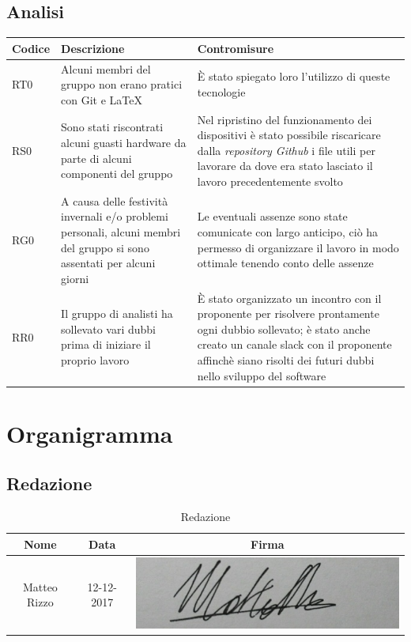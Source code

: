 \documentclass[./PianodiProgetto.tex]{subfiles}
\begin{document}
\section{Analisi}

\setlength\LTleft{-5.5mm}

\begin{longtable}{|p{15mm}|p{60mm}|p{60mm}|}
	\hline \textbf{Codice} & \textbf{Descrizione} & \textbf{Contromisure} \\
	\hline RT0 & Alcuni membri del gruppo non erano pratici con Git e \LaTeX &  È stato spiegato loro l'utilizzo di queste tecnologie \\
	\hline RS0 & Sono stati riscontrati alcuni guasti hardware da parte di alcuni componenti del gruppo & Nel ripristino del funzionamento dei dispositivi è stato possibile riscaricare dalla \textit{repository Github} i file utili per lavorare da dove era stato lasciato il lavoro precedentemente svolto \\
	\hline RG0 & A causa delle festività invernali e/o problemi personali, alcuni membri del gruppo si sono assentati per alcuni giorni & Le eventuali assenze sono state comunicate con largo anticipo, ciò ha permesso di organizzare il lavoro in modo ottimale tenendo conto delle assenze \\
	\hline RR0 & Il gruppo di analisti ha sollevato vari dubbi prima di iniziare il proprio lavoro & È stato organizzato un incontro con il proponente per risolvere prontamente ogni dubbio sollevato; è stato anche creato un canale slack con il proponente affinchè siano risolti dei futuri dubbi nello sviluppo del software \\
	\hline
\end{longtable}

\chapter{Organigramma}

\section{Redazione}
\begin{table}[H]
	\centering
	\begin{tabular}{|c|c|c|}
		\hline
		Nome&Data&Firma \\ \hline
		Matteo Rizzo& 12-12-2017 &\includegraphics[scale=0.5]{img/firme/RizzoMatteo} \\
		\hline
	\end{tabular}
	\caption{Redazione}
\end{table}
\end{document}
